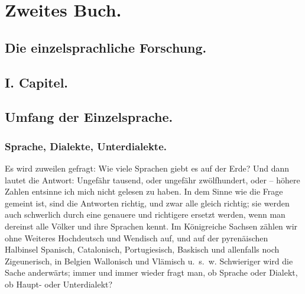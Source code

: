 \chapter*{Zweites Buch.}
\section*{Die einzelsprachliche Forschung.}

\section*{I. Capitel.}
\section*{Umfang der Einzelsprache.}

\subsection*{Sprache, Dialekte, Unterdialekte.}\label{II.I}
\label{fp.54} \label{sp.54}

Es wird zuweilen gefragt: Wie viele Sprachen giebt es auf der Erde? Und dann lautet die Antwort: Ungefähr tausend, oder ungefähr zwölfhundert, oder  – höhere Zahlen entsinne ich mich nicht gelesen zu haben. In dem Sinne wie die Frage gemeint ist, sind die Antworten richtig, und zwar alle  gleich richtig; sie werden auch schwerlich durch eine genauere und richtigere ersetzt werden, wenn man dereinst alle Völker und ihre Sprachen kennt. Im Königreiche Sachsen zählen wir ohne Weiteres Hochdeutsch und Wendisch auf, und auf der pyrenäischen Halbinsel Spanisch, Catalonisch, Portugiesisch, Baskisch und allenfalls noch Zigeunerisch, in Belgien  Wallonisch und Vlämisch u.~s.~w. Schwieriger wird die Sache anderwärts; immer und immer wieder fragt man, ob Sprache oder Dialekt, ob Haupt- oder Unterdialekt?

